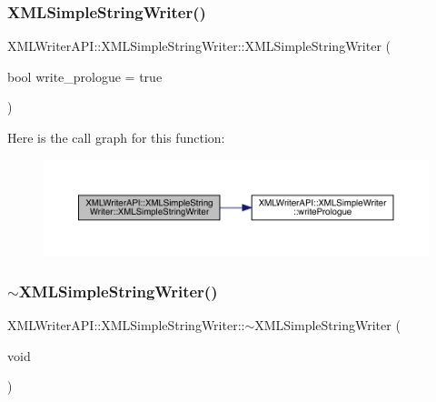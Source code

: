 \subsubsection{\texorpdfstring{XMLSimpleStringWriter()}{XMLSimpleStringWriter()}\hspace{0.1cm}{\footnotesize\ttfamily [2/2]}}
{\footnotesize\ttfamily X\+M\+L\+Writer\+A\+P\+I\+::\+X\+M\+L\+Simple\+String\+Writer\+::\+X\+M\+L\+Simple\+String\+Writer (\begin{DoxyParamCaption}\item[{bool}]{write\+\_\+prologue = {\ttfamily true} }\end{DoxyParamCaption})\hspace{0.3cm}{\ttfamily [inline]}}

Here is the call graph for this function\+:
\nopagebreak
\begin{figure}[H]
\begin{center}
\leavevmode
\includegraphics[width=350pt]{da/dec/classXMLWriterAPI_1_1XMLSimpleStringWriter_a7caa663dd64c87fa0eabc563154143a5_cgraph}
\end{center}
\end{figure}
\mbox{\label{classXMLWriterAPI_1_1XMLSimpleStringWriter_a10b08cc22793241a637eefa425e0ebe5}} 
\subsubsection{\texorpdfstring{$\sim$XMLSimpleStringWriter()}{~XMLSimpleStringWriter()}\hspace{0.1cm}{\footnotesize\ttfamily [2/2]}}
{\footnotesize\ttfamily X\+M\+L\+Writer\+A\+P\+I\+::\+X\+M\+L\+Simple\+String\+Writer\+::$\sim$\+X\+M\+L\+Simple\+String\+Writer (\begin{DoxyParamCaption}\item[{void}]{ }\end{DoxyParamCaption})\hspace{0.3cm}{\ttfamily [inline]}}

